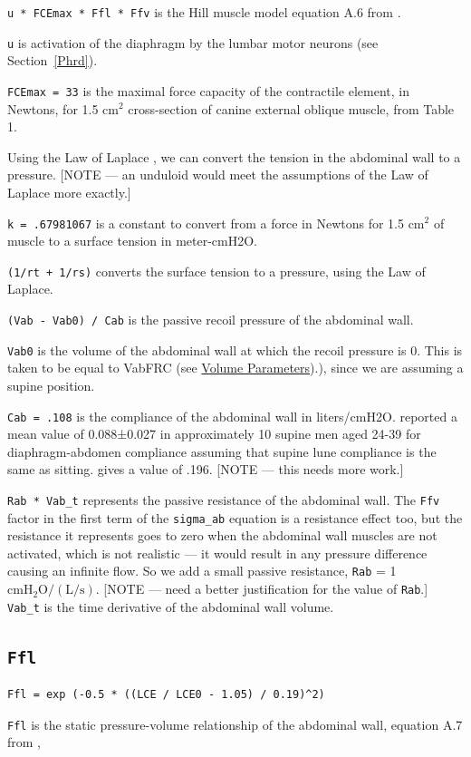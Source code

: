\documentclass[12pt,openany,oneside]{book}
\begin{document}
\verb~u * FCEmax * Ffl * Ffv~ is the Hill muscle model equation A.6
from \citet{Ratnovsky20031771}.

\verb~u~ is activation of the diaphragm by the lumbar motor neurons
(see Section~\ref{Phrd}).

\verb~FCEmax = 33~ is the maximal force capacity of the contractile
element, in Newtons, for 1.5 cm$^2$ cross-section of canine external
oblique muscle, from \citet{Ratnovsky20031771} Table 1.

Using the Law of Laplace \citep{laplace1808traite}, we can convert the
tension in the abdominal wall to a pressure. [NOTE --- an unduloid
would meet the assumptions of the Law of Laplace more exactly.]

\verb~k = .67981067~ is a constant to convert from a force in Newtons
for 1.5 cm$^2$ of muscle to a surface tension in meter-cmH2O.

\verb~(1/rt + 1/rs)~ converts the surface tension to a pressure, using
the Law of Laplace.

\verb~(Vab - Vab0) / Cab~ is the passive recoil pressure of the
abdominal wall.

\verb~Vab0~ is the volume of the abdominal wall at which the recoil
pressure is 0. This is taken to be equal to VabFRC
(see \hyperref[Volume Parameters]{Volume Parameters}).), since we are
assuming a supine position.

\verb~Cab = .108~ is the compliance of the abdominal wall in
liters/cmH2O. \citet{Estenne1985} reported a mean value of
0.088±0.027 in approximately 10 supine men aged 24-39 for
diaphragm-abdomen compliance assuming that supine lune compliance is
the same as sitting. \citet{Cala01031993} gives a value of .196.
[NOTE --- this needs more work.]

\verb~Rab * Vab_t~ represents the passive resistance of the abdominal
wall. The \verb~Ffv~ factor in the first term of the \verb~sigma_ab~
equation is a resistance effect too, but the resistance it represents
goes to zero when the abdominal wall muscles are not activated, which
is not realistic --- it would result in any pressure difference
causing an infinite flow. So we add a small passive resistance,
\verb~Rab~ = 1 $\mathrm{cmH_2O/(L/s)}$. [NOTE --- need a better
justification for the value of \verb~Rab~.]  \verb~Vab_t~ is the time
derivative of the abdominal wall volume.

\subsection{\texttt{Ffl}}
\begin{verbatim}
Ffl = exp (-0.5 * ((LCE / LCE0 - 1.05) / 0.19)^2)
\end{verbatim}
\verb~Ffl~ is the static pressure-volume relationship of the
abdominal wall, equation A.7 from \citet{Ratnovsky20031771}, 
\end{document}
